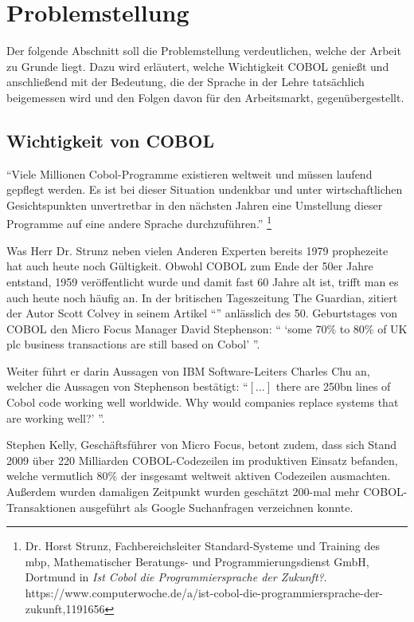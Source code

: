 \section{Problemstellung}\label{problemstellung}
Der folgende Abschnitt soll die Problemstellung verdeutlichen, welche der Arbeit zu Grunde liegt. 
Dazu wird erläutert, welche Wichtigkeit COBOL genießt und anschließend mit der Bedeutung, die der Sprache in der Lehre tatsächlich beigemessen wird und den Folgen davon für den Arbeitsmarkt, gegenübergestellt.

\subsection{Wichtigkeit von COBOL}
``Viele Millionen Cobol-Programme existieren weltweit und müssen laufend gepflegt werden.
Es ist bei dieser Situation undenkbar und unter wirtschaftlichen Gesichtspunkten unvertretbar in den nächsten Jahren eine Umstellung dieser Programme auf eine andere Sprache durchzuführen.'' \footnote{Dr. Horst Strunz, Fachbereichsleiter Standard-Systeme und Training des mbp, Mathematischer Beratungs- und Programmierungsdienst GmbH, Dortmund in \textit{Ist Cobol die Programmiersprache der Zukunft?}. \\ https://www.computerwoche.de/a/ist-cobol-die-programmiersprache-der-zukunft,1191656}

Was Herr Dr. Strunz neben vielen Anderen Experten bereits 1979 prophezeite hat auch heute noch Gültigkeit. Obwohl COBOL zum Ende der 50er Jahre entstand, 1959 veröffentlicht wurde und damit fast 60 Jahre alt ist, trifft man es auch heute noch häufig an. In der britischen Tageszeitung The Guardian, zitiert der Autor Scott Colvey in seinem Artikel ``'' \cite{colvey_cobol_2009} anlässlich des 50. Geburtstages von COBOL den Micro Focus Manager David Stephenson: `` `some 70\% to 80\% of UK plc business transactions are still based on Cobol' ''. 

Weiter führt er darin Aussagen von IBM Software-Leiters Charles Chu an, welcher die Aussagen von Stephenson bestätigt: ``$[\ldots]$ there are 250bn lines of Cobol code working well worldwide. Why would companies replace systems that are working well?' ''. 

Stephen Kelly, Geschäftsführer von Micro Focus, betont zudem, dass sich Stand 2009 über 220 Milliarden COBOL-Codezeilen im produktiven Einsatz befanden, welche vermutlich 80\% der insgesamt weltweit aktiven Codezeilen ausmachten. Außerdem wurden damaligen Zeitpunkt wurden geschätzt 200-mal mehr COBOL-Transaktionen ausgeführt als Google Suchanfragen verzeichnen konnte. \cite{kelly_cobol_2009}

